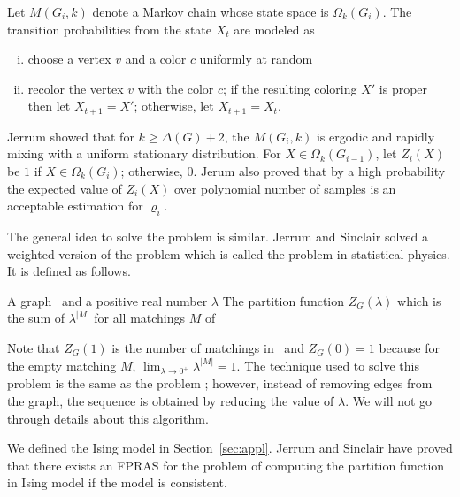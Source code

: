 Let \(M(G_i, k)\) denote a Markov chain whose state space is \(\Omega_k(G_i)\)\@. The transition probabilities from the state \(X_t\) are modeled as 
\begin{enumerate}[i)]
\item choose a vertex \(v\) and a color \(c\) uniformly at random
\item recolor the vertex \(v\) with the color \(c\); if the resulting coloring \(X'\)
is proper then let \(X_{t+1}=X'\); otherwise, let \(X_{t+1}=X_t\)\@.
\end{enumerate}

Jerrum \cite{Jerrum} showed that for \(k \ge \Delta(G) + 2\), the \(M(G_i,k)\) is ergodic and 
rapidly mixing with a uniform stationary distribution. For \(X\in \Omega_k(G_{i-1})\),
let \(Z_i(X)\) be \(1\) if \(X\in \Omega_k(G_i)\); otherwise, \(0\)\@.
Jerum also proved that by a high probability the expected value of 
\(Z_i(X)\) over polynomial number of samples is an
acceptable estimation for \(\varrho_i\)\@.

The general idea to solve the problem  is similar. Jerrum and Sinclair \cite{Jerrum96}
solved a weighted version of the problem  which is called the problem 
 in statistical physics. It is defined as follows.

{A graph \mG\ and a positive real number \(\lambda\)}
{The partition function \(Z_G(\lambda)\) which is the sum of
\(\lambda^{|M|}\) for all matchings \(M\) of \mG}

Note that \(Z_G(1)\) is the number of matchings in \mG\ and \(Z_G(0)=1\) because
for the empty matching \(M\), \(\lim_{\lambda\to 0^+}\lambda^{|M|}=1\). The technique used to
solve this problem is the same as the problem \ldkcol; however, instead of removing edges from
the graph, the sequence is obtained by reducing the value of \(\lambda\)\@. We will not 
go through details about this algorithm.

We defined the Ising model in Section~\ref{sec:appl}\@. 
Jerrum and Sinclair \cite{Jer93} have proved that there exists an FPRAS for the
problem of computing the partition function in Ising model if the model 
is consistent.

